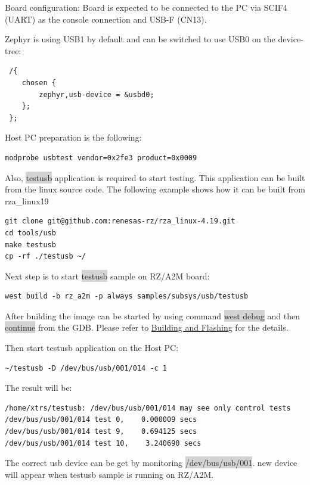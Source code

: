 \documentclass[11pt,a4paper,oneside]{article}
\begin{document}
Board configuration: Board is expected to be connected to the PC via SCIF4 (UART) as the console
connection and USB-F (CN13).

Zephyr is using USB1 by default and can be switched to use USB0 on the device-tree:
\begin{lstlisting}
 /{
	chosen {
		zephyr,usb-device = &usbd0;
	};
 };
\end{lstlisting}

Host PC preparation is the following:
\begin{lstlisting}
modprobe usbtest vendor=0x2fe3 product=0x0009
\end{lstlisting}

Also, \colorbox{lightgray}{testusb} application is required to start testing.
This application can be built from the linux source code.
The following example shows how it can be built from rza\_linux\.19

\begin{lstlisting}
git clone git@github.com:renesas-rz/rza_linux-4.19.git
cd tools/usb
make testusb
cp -rf ./testusb ~/
\end{lstlisting}

Next step is to start \colorbox{lightgray}{testusb} sample on RZ/A2M board:
\begin{lstlisting}
west build -b rz_a2m -p always samples/subsys/usb/testusb
\end{lstlisting}

After building the image can be started by using command \colorbox{lightgray}{west debug}
and then \colorbox{lightgray}{continue} from the GDB. Please refer to
\hyperref[building-and-flashing]{Building and Flashing} for the
details.

Then start testusb application on the Host PC:
\begin{lstlisting}
~/testusb -D /dev/bus/usb/001/014 -c 1
\end{lstlisting}

The result will be:

\begin{lstlisting}
/home/xtrs/testusb: /dev/bus/usb/001/014 may see only control tests
/dev/bus/usb/001/014 test 0,    0.000009 secs
/dev/bus/usb/001/014 test 9,    0.694125 secs
/dev/bus/usb/001/014 test 10,    3.240690 secs
\end{lstlisting}

The correct usb device can be get by monitoring \colorbox{lightgray}{/dev/bus/usb/001}.
new device will appear when testusb sample is running on RZ/A2M.
\end{document}
